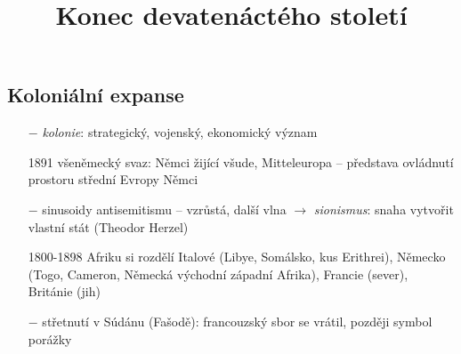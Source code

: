 \documentclass{article}
\title{\vspace{-2cm}Konec devatenáctého století\vspace{-1.7cm}}
\date{}
\author{}
\begin{document}
\maketitle

\subsection*{Koloniální expanse}
\begin{itemize}
    \vspace{-0.5em}
    \setlength\itemsep{0.15em}
    \item[$-$] \textit{kolonie}: strategický, vojenský, ekonomický význam
    \item[1891] všeněmecký svaz: Němci žijící všude, Mitteleuropa -- představa ovládnutí prostoru střední Evropy Němci
    \item[$-$] sinusoidy antisemitismu -- vzrůstá, další vlna $\rightarrow$  \textit{sionismus}: snaha vytvořit vlastní stát (Theodor Herzel)
    \item[1800-1898] Afriku si rozdělí Italové (Libye, Somálsko, kus Erithrei), Německo (Togo, Cameron, Německá východní  západní Afrika), Francie (sever), Británie (jih)
    \item[$-$] střetnutí v Súdánu (Fašodě): francouzský sbor se vrátil, později symbol porážky
\end{itemize}
\end{document}
